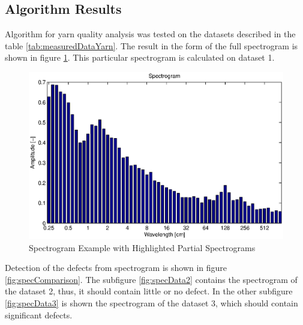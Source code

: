 \documentclass[twoside]{ctuthesis}
\theoremstyle{plain}
\theoremstyle{definition}
\theoremstyle{note}
\begin{document}
\subsection{Algorithm Results}
Algorithm for yarn quality analysis was tested on the datasets described in the table \ref{tab:measuredDataYarn}. The result in the form of the full spectrogram is shown in figure \ref{fig:yarnSpec_1}. This particular spectrogram is calculated on dataset 1.

\begin{figure}[h]
	\centering
	\includegraphics[width=1.0\textwidth]{prize4.eps}
	\caption{Spectrogram Example with Highlighted Partial Spectrograms}
	\label{fig:yarnSpec_1}
\end{figure}
Detection of the defects from spectrogram is shown in figure \ref{fig:specComparison}. The subfigure \ref{fig:specData2} contains the spectrogram of the dataset 2, thus, it should contain little or no defect. In the other subfigure \ref{fig:specData3} is shown the spectrogram of the dataset 3, which should contain significant defects.
\end{document}
